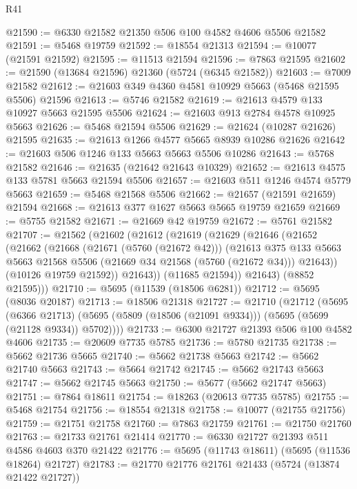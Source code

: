 \begin{lexlean}{R41}
\begin{coremodule}
@21590 := @6330 @21582 @21350 @506 @100 @4582 @4606 @5506 @21582
@21591 := @5468 @19759
@21592 := @18554 @21313
@21594 := @10077 (@21591 @21592)
@21595 := @11513 @21594
@21596 := @7863 @21595
@21602 := @21590 (@13684 @21596) @21360 (@5724 (@6345 @21582))
@21603 := @7009 @21582
@21612 := @21603 @349 @4360 @4581 @10929 @5663 (@5468 @21595 @5506) @21596
@21613 := @5746 @21582
@21619 := @21613 @4579 @133 @10927 @5663 @21595 @5506
@21624 := @21603 @913 @2784 @4578 @10925 @5663
@21626 := @5468 @21594 @5506
@21629 := @21624 (@10287 @21626) @21595
@21635 := @21613 @1266 @4577 @5665 @8939 @10286 @21626
@21642 := @21603 @506 @1246 @133 @5663 @5663 @5506 @10286
@21643 := @5768 @21582
@21646 := @21635 (@21642 @21643 @10329)
@21652 := @21613 @4575 @133 @5781 @5663 @21594 @5506
@21657 := @21603 @511 @1246 @4574 @5779 @5663
@21659 := @5468 @21568 @5506
@21662 := @21657 (@21591 @21659) @21594
@21668 := @21613 @377 @1627 @5663 @5665 @19759 @21659
@21669 := @5755 @21582
@21671 := @21669 @42 @19759
@21672 := @5761 @21582
@21707 := @21562
    (@21602
      (@21612
        (@21619
          (@21629
            (@21646
              (@21652
                (@21662
                  (@21668
                    (@21671 (@5760 (@21672 @42)))
                    (@21613
                      @375
                      @133
                      @5663
                      @5663
                      @21568
                      @5506
                      (@21669 @34 @21568 (@5760 (@21672 @34)))
                      @21643))
                  (@10126 @19759 @21592))
                @21643))
            (@11685 @21594))
          @21643)
        (@8852 @21595)))
@21710 := @5695 (@11539 (@18506 @6281))
@21712 := @5695 (@8036 @20187)
@21713 := @18506 @21318
@21727 := @21710
    (@21712
      (@5695
        (@6366 @21713)
        (@5695 (@5809 (@18506 (@21091 @9334))) (@5695 (@5699 (@21128 @9334)) @5702))))
@21733 := @6300 @21727 @21393 @506 @100 @4582 @4606
@21735 := @20609 @7735 @5785
@21736 := @5780 @21735
@21738 := @5662 @21736 @5665
@21740 := @5662 @21738 @5663
@21742 := @5662 @21740 @5663
@21743 := @5664 @21742
@21745 := @5662 @21743 @5663
@21747 := @5662 @21745 @5663
@21750 := @5677 (@5662 @21747 @5663)
@21751 := @7864 @18611
@21754 := @18263 (@20613 @7735 @5785)
@21755 := @5468 @21754
@21756 := @18554 @21318
@21758 := @10077 (@21755 @21756)
@21759 := @21751 @21758
@21760 := @7863 @21759
@21761 := @21750 @21760
@21763 := @21733 @21761 @21414
@21770 := @6330 @21727 @21393 @511 @4586 @4603 @370 @21422
@21776 := @5695 (@11743 @18611) (@5695 (@11536 @18264) @21727)
@21783 := @21770 @21776 @21761 @21433 (@5724 (@13874 @21422 @21727))

\end{coremodule}
\end{lexlean}
